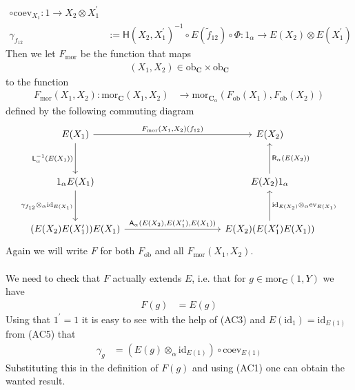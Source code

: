 \begin{prf}[Sketch]
\begin{align*}
  \circ
  \mathrm{coev}_{X_{1}}
  \colon
  1
  \to
  X_{2}
  \otimes
  X_{1}^{\prime}
  \\
  \gamma_{f_{12}}
  &:=
  \mathsf{H}(X_{2},X_{1}^{\prime})^{-1}
  \circ
  E(\tilde{f}_{12})
  \circ
  \Phi
  \colon
  1_{\alpha}
  \to
  E(X_{2})
  \otimes
  E(X_{1}^{\prime})
\end{align*}
Then we let $F_{\mathrm{mor}}$ be the function that maps
\begin{align*}
  (X_{1},X_{2})
  \in
  \mathrm{ob}_{\mathbf{C}}
  \times
  \mathrm{ob}_{\mathbf{C}}
\end{align*}
to the function
\begin{align*}
  F_{\mathrm{mor}}(X_{1},X_{2})
  \colon
  \mathrm{mor}_{\mathbf{C}}(X_{1},X_{2})
  &\to
  \mathrm{mor}_{\mathbf{C}_{\alpha}}(F_{\mathrm{ob}}(X_{1}),F_{\mathrm{ob}}(X_{2}))
\end{align*}
defined by the following commuting diagram
\begin{equation*}
\begin{tikzcd}[row sep=3.2em,column sep=10em]
  E(X_{1})
  \ar{r}{F_{\mathrm{mor}}(X_{1},X_{2})(f_{12})}
  \ar{d}[swap]{\mathsf{L}_{\alpha}^{-1}(E(X_{1}))}
  &
  E(X_{2})
  \\
  1_{\alpha} E(X_{1})
  \ar{d}[swap]{\gamma_{f_{12}} \otimes_{\alpha} \mathrm{id}_{E(X_{1})}}
  &
  E(X_{2}) 1_{\alpha}
  \ar{u}[swap]{\mathsf{R}_{\alpha}(E(X_{2}))}
  \\
  (E(X_{2}) E(X_{1}^{\prime})) E(X_{1})
  \ar{r}{\mathsf{A}_{\alpha}(E(X_{2}),E(X_{1}^{\prime}),E(X_{1}))}
  &
  E(X_{2}) (E(X_{1}^{\prime}) E(X_{1}))
  \ar{u}[swap]{\mathrm{id}_{E(X_{2})} \otimes_{\alpha} \mathrm{ev}_{E(X_{1})}}
\end{tikzcd}
\end{equation*}
Again we will write $F$ for both $F_{\mathrm{ob}}$ and all $F_{\mathrm{mor}}(X_{1},X_{2})$.
\\\\
We need to check that $F$ actually extends $E$, i.e. that for $g \in \mathrm{mor}_{\mathbf{C}}(1,Y)$ we have
\begin{align*}
  F(g)
  &=
  E(g)
\end{align*}
Using that $1^{\prime} = 1$ it is easy to see with the help of (AC3) and $E(\mathrm{id}_{1}) = \mathrm{id}_{E(1)}$ from (AC5) that
\begin{align*}
  \gamma_{g}
  &=
  \left(
    E(g)
    \otimes_{\alpha}
    \mathrm{id}_{E(1)}
  \right)
  \circ
  \mathrm{coev}_{E(1)}
\end{align*}
Substituting this in the definition of $F(g)$ and using (AC1) one can obtain the wanted result.

\end{prf}
